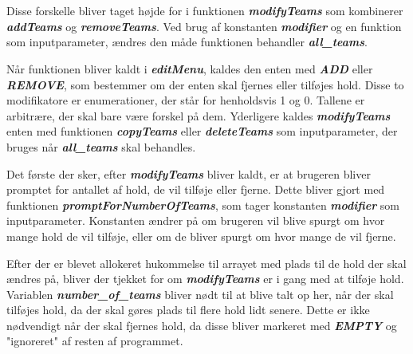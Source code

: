 \\\\
Disse forskelle bliver taget højde for i funktionen \textbf{\textit{modifyTeams}} som kombinerer \textbf{\textit{addTeams}} og \textbf{\textit{removeTeams}}. Ved brug af konstanten \textbf{\textit{modifier}} og en funktion som inputparameter, ændres den måde funktionen behandler \textbf{\textit{all\_teams}}.
\par
Når funktionen bliver kaldt i \textbf{\textit{editMenu}}, kaldes den enten med \textbf{\textit{ADD}} eller \textbf{\textit{REMOVE}}, som bestemmer om der enten skal fjernes eller tilføjes hold. Disse to modifikatore er enumerationer, der står for henholdsvis 1 og 0. Tallene er arbitrære, der skal bare være forskel på dem. Yderligere kaldes \textbf{\textit{modifyTeams}} enten med funktionen \textbf{\textit{copyTeams}} eller \textbf{\textit{deleteTeams}} som inputparameter, der bruges når \textbf{\textit{all\_teams}} skal behandles.
\par
Det første der sker, efter \textbf{\textit{modifyTeams}} bliver kaldt, er at brugeren bliver promptet for antallet af hold, de vil tilføje eller fjerne. Dette bliver gjort med funktionen \textbf{\textit{promptForNumberOfTeams}}, som tager konstanten \textbf{\textit{modifier}} som inputparameter. Konstanten ændrer på om brugeren vil blive spurgt om hvor mange hold de vil tilføje, eller om de bliver spurgt om hvor mange de vil fjerne. 
\par
Efter der er blevet allokeret hukommelse til arrayet med plads til de hold der skal ændres på, bliver der tjekket for om \textbf{\textit{modifyTeams}} er i gang med at tilføje hold.  Variablen \textbf{\textit{number\_of\_teams}} bliver nødt til at blive talt op her, når der skal tilføjes hold, da der skal gøres plads til flere hold lidt senere. Dette er ikke nødvendigt når der skal fjernes hold, da disse bliver markeret med \textbf{\textit{EMPTY}} og "ignoreret" af resten af programmet.

